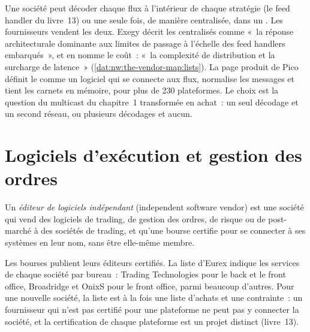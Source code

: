 Une société peut décoder chaque flux à l'intérieur de chaque stratégie (le feed handler du livre~13) ou une seule fois, de manière centralisée, dans un .
Les fournisseurs vendent les deux. Exegy décrit les  centralisés comme «~la réponse architecturale dominante aux limites de passage à l'échelle des
feed handlers embarqués~», et en nomme le coût~: «~la complexité de distribution et la surcharge de latence~»
(\cref{dat:nw:the-vendor-map:lists}). La page produit de Pico définit le  comme un logiciel qui se connecte aux flux,
normalise les messages et tient les carnets en mémoire, pour plus de 230 plateformes. Le choix est la question du multicast du chapitre~1
transformée en achat~: un seul décodage et un second réseau, ou plusieurs décodages et aucun.

\section{Logiciels d'exécution et gestion des ordres}

\begin{definition}\label{def:nw:the-vendor-map:isv}
Un \emph{éditeur de logiciels indépendant} (independent software vendor) est une société qui vend des logiciels de trading, de gestion des ordres,
de risque ou de post-marché à des sociétés de trading, et qu'une bourse certifie pour se connecter à ses systèmes en leur nom, sans être
elle-même membre.
\end{definition}

Les bourses publient leurs éditeurs certifiés. La liste d'Eurex indique les services de chaque société par bureau~: Trading Technologies pour le back
et le front office, Broadridge et OnixS pour le front office, parmi beaucoup d'autres. Pour une nouvelle société, la liste est à la fois une liste d'achats et
une contrainte~: un fournisseur qui n'est pas certifié pour une plateforme ne peut pas y connecter la société, et la certification de chaque plateforme est un
projet distinct (livre~13).

